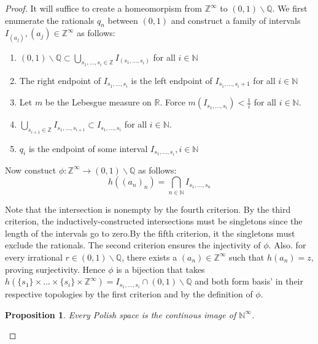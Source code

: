 \documentclass[12pt]{article}
\newtheorem{proposition}{Proposition}[section]
\theoremstyle{remark}
\begin{document}
\begin{proof}
 It will suffice to create a homeomorpism from $\mathbb{Z}^{\infty}$ to $(0,1) \backslash \mathbb{Q}$. We first enumerate the rationals $q_n$ between $(0,1)$ and construct a family of intervals $I_{(a_j)}, (a_j) \in \mathbb{Z}^{\infty}$ as follows:
 \begin{enumerate}
  \item $(0,1) \backslash \mathbb{Q} \subset \bigcup_{s_1,...,s_i \in \mathbb{Z}} I_{(s_1,...,s_i)}$ for all $i \in \mathbb{N}$
  \item The right endpoint of $I_{s_1,...,s_i}$ is the left endpoint of $I_{s_1,...,s_i+1}$ for all $i \in \mathbb{N}$
  \item Let $m$ be the Lebesgue measure on $\mathbb{R}$. Force $m(I_{s_1,...,s_i}) < \frac{1}{i}$ for all $i \in \mathbb{N}$.
  \item $ \bigcup_{s_{i+1} \in \mathbb{Z}} I_{s_1,...,s_{i+1}} \subset I_{s_1,...,s_i}$ for all $i \in \mathbb{N}$.
  \item $q_i$ is the endpoint of some interval $I_{s_1,...,s_i}, i \in \mathbb{N}$
 \end{enumerate}
 
  Now constuct $\phi: \mathbb{Z}^{\infty} \rightarrow (0,1) \backslash \mathbb{Q}$
  as follows:
  $$h((a_n)_n) = \bigcap_{n \in \mathbb{N}} I_{s_1,...,s_n} $$

Note that the intersection is nonempty by the fourth criterion. By the third criterion, the inductively-constructed intersections must be singletons since the length of the intervals go to zero.By the fifth criterion, it the singletons must exclude the rationals. The second criterion ensures the injectivity of $\phi$. Also. for every irrational $r \in (0,1) \backslash \mathbb{Q}$, there exists a $(a_n) \in \mathbb{Z}^{\infty}$ such that $h(a_n) = z$, proving surjectivity. Hence $\phi$ is a bijection that takes $h(\{s_1\} \times ... \times \{s_i\} \times \mathbb{Z}^{\infty}) = I_{s_1,...,s_i} \cap (0,1) \backslash \mathbb{Q}$ and both form basis' in their respective topologies by the first criterion and by the definition of $\phi$.

\begin{proposition}
Every Polish space is the continous image of $\mathbb{N}^{\infty}$.
\end{proposition}

\end{proof}
\end{document}
